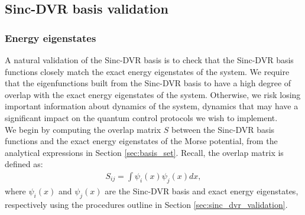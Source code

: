 \documentclass{subfiles}
\begin{document}
\subsection{Sinc-DVR basis validation}
\subsubsection*{Energy eigenstates}
A natural validation of the Sinc-DVR basis is to check that the Sinc-DVR basis functions closely match the exact energy eigenstates of the system. We require that the eigenfunctions built from the Sinc-DVR basis to have a high degree of overlap with the exact energy eigenstates of the system. Otherwise, we risk losing important information about dynamics of the system, dynamics that may have a significant impact on the quantum control protocols we wish to implement.\\ 

We begin by computing the overlap matrix $S$ between the Sinc-DVR basis functions and the exact energy eigenstates of the Morse potential, from the analytical expressions in Section \ref{sec:basis_set}. Recall, the overlap matrix is defined as:
\begin{align*}
    S_{ij} = \int \psi_i(x) \psi_j(x) dx,
\end{align*}
where $\psi_i(x)$ and $\psi_j(x)$ are the Sinc-DVR basis and exact energy eigenstates, respectively using the procedures outline in Section \ref{sec:sinc_dvr_validation}.
\end{document}

